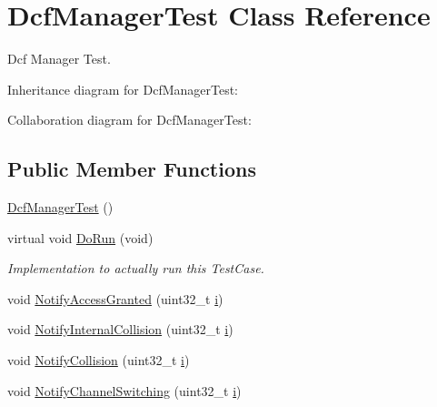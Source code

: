 \hypertarget{classDcfManagerTest}{}\section{Dcf\+Manager\+Test Class Reference}
\label{classDcfManagerTest}


Dcf Manager Test.  




Inheritance diagram for Dcf\+Manager\+Test\+:


Collaboration diagram for Dcf\+Manager\+Test\+:
\subsection*{Public Member Functions}
\begin{DoxyCompactItemize}
\item 
\hyperlink{classDcfManagerTest_a57727cf97ae64440616cc891a9ed80ee}{Dcf\+Manager\+Test} ()
\item 
virtual void \hyperlink{classDcfManagerTest_a390064219f500f8f6934c072a7200cd6}{Do\+Run} (void)
\begin{DoxyCompactList}\small\item\em Implementation to actually run this Test\+Case. \end{DoxyCompactList}\item 
void \hyperlink{classDcfManagerTest_a404e242b28b2a388d3b7e3a057dfe04a}{Notify\+Access\+Granted} (uint32\+\_\+t \hyperlink{lte__uplink__power__control_8m_a6f6ccfcf58b31cb6412107d9d5281426}{i})
\item 
void \hyperlink{classDcfManagerTest_ae443883ee311ff02958365c3857dd228}{Notify\+Internal\+Collision} (uint32\+\_\+t \hyperlink{lte__uplink__power__control_8m_a6f6ccfcf58b31cb6412107d9d5281426}{i})
\item 
void \hyperlink{classDcfManagerTest_a4d9e1e555129f4b5dddbf24c8aa75558}{Notify\+Collision} (uint32\+\_\+t \hyperlink{lte__uplink__power__control_8m_a6f6ccfcf58b31cb6412107d9d5281426}{i})
\item 
void \hyperlink{classDcfManagerTest_a3ce89eb02a8a53e2cd6712cd8067657f}{Notify\+Channel\+Switching} (uint32\+\_\+t \hyperlink{lte__uplink__power__control_8m_a6f6ccfcf58b31cb6412107d9d5281426}{i})
\end{DoxyCompactItemize}
